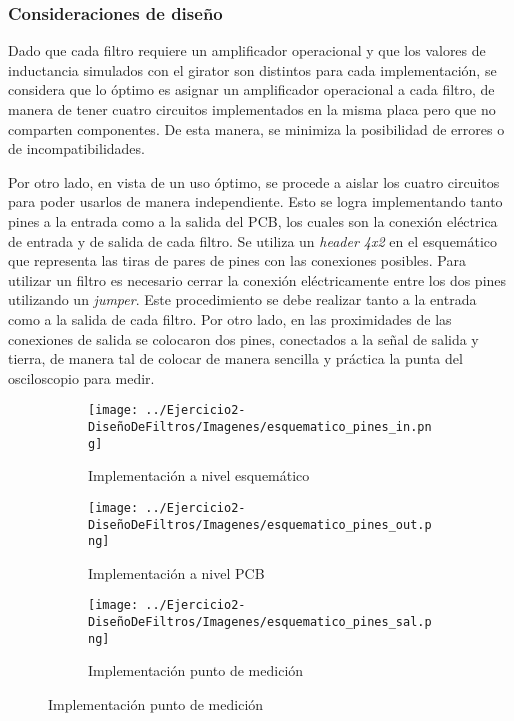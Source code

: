 \subsubsection{Consideraciones de diseño}
Dado que cada filtro requiere un amplificador operacional y que los valores de inductancia simulados con el girator son distintos para cada implementación,
se considera que lo óptimo es asignar un amplificador operacional a cada filtro, de manera de tener cuatro circuitos implementados en
 la misma placa pero que no comparten 
componentes. De esta manera, se minimiza la posibilidad de errores o de incompatibilidades. \par 

Por otro lado, en vista de un uso óptimo, se procede a aislar los cuatro circuitos para poder usarlos de manera independiente. Esto se logra implementando 
tanto pines a la entrada como a la salida del PCB, los cuales son la conexión eléctrica de entrada y de salida de cada filtro. Se utiliza un 
\textit{header 4x2} en el esquemático que representa las tiras de pares de pines con las conexiones posibles. Para utilizar un filtro es necesario cerrar
 la conexión eléctricamente entre los dos pines utilizando un \textit{jumper}. Este procedimiento se debe realizar tanto a la entrada como a la salida de 
 cada filtro.  Por otro lado, en las proximidades de las conexiones de salida se colocaron dos pines, conectados a la señal de salida y tierra,
  de manera tal de colocar de manera sencilla y práctica la punta del osciloscopio para medir.

\begin{figure}
      
 \centering
 \begin{subfigure}[b]{0.33\textwidth}
     \centering
     \texttt{[image: ../Ejercicio2-DiseñoDeFiltros/Imagenes/esquematico\_pines\_in.png]}
     \caption{Implementación a nivel esquemático}
 \end{subfigure}
 \hfill
 \begin{subfigure}[b]{0.33\textwidth}
     \centering
     \texttt{[image: ../Ejercicio2-DiseñoDeFiltros/Imagenes/esquematico\_pines\_out.png]}
     \caption{Implementación a nivel PCB}
 \end{subfigure}
 \hfill
 \begin{subfigure}[b]{0.33\textwidth}
    \centering
    \texttt{[image: ../Ejercicio2-DiseñoDeFiltros/Imagenes/esquematico\_pines\_sal.png]}
    \caption{Implementación punto de medición}
\end{subfigure}
\end{figure}

